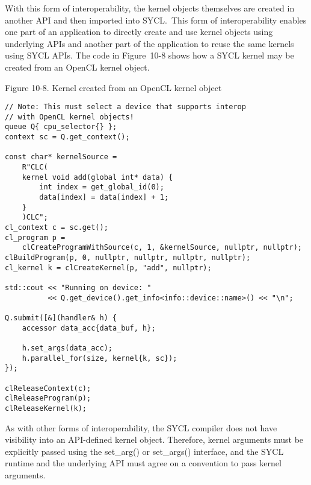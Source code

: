 With this form of interoperability, the kernel objects themselves are created in another API and then imported into SYCL. This form of interoperability enables one part of an application to directly create and use kernel objects using underlying APIs and another part of the application to reuse the same kernels using SYCL APIs. The code in Figure 10-8 shows how a SYCL kernel may be created from an OpenCL kernel object.\par

\hspace*{\fill} \par %
Figure 10-8. Kernel created from an OpenCL kernel object
\begin{lstlisting}[caption={}]
// Note: This must select a device that supports interop 
// with OpenCL kernel objects!
queue Q{ cpu_selector{} };
context sc = Q.get_context();

const char* kernelSource =
	R"CLC(
	kernel void add(global int* data) {
		int index = get_global_id(0);
		data[index] = data[index] + 1;
	}
	)CLC";
cl_context c = sc.get();
cl_program p =
	clCreateProgramWithSource(c, 1, &kernelSource, nullptr, nullptr);
clBuildProgram(p, 0, nullptr, nullptr, nullptr, nullptr);
cl_kernel k = clCreateKernel(p, "add", nullptr);

std::cout << "Running on device: "
	 	  << Q.get_device().get_info<info::device::name>() << "\n";
	 	  
Q.submit([&](handler& h) {
	accessor data_acc{data_buf, h};
	
	h.set_args(data_acc);
	h.parallel_for(size, kernel{k, sc});
});

clReleaseContext(c);
clReleaseProgram(p);
clReleaseKernel(k);
\end{lstlisting}

As with other forms of interoperability, the SYCL compiler does not have visibility into an API-defined kernel object. Therefore, kernel arguments must be explicitly passed using the set\_arg() or set\_args() interface, and the SYCL runtime and the underlying API must agree on a convention to pass kernel arguments.\par









































